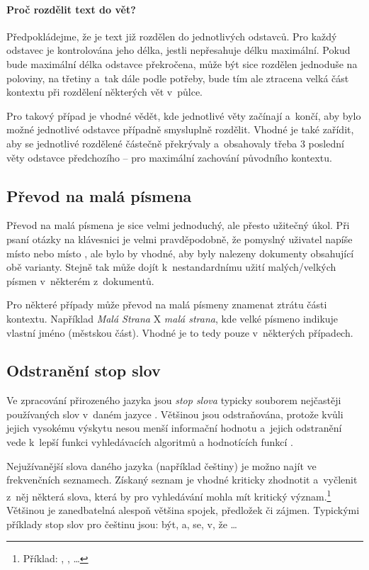 \paragraph{Proč rozdělit text do vět?}
Předpokládejme, že je text již rozdělen do jednotlivých odstavců. Pro každý odstavec je kontrolována jeho délka, jestli nepřesahuje délku maximální. Pokud bude maximální délka odstavce překročena, může být sice rozdělen jednoduše na poloviny, na třetiny a~tak dále podle potřeby, bude tím ale ztracena velká část kontextu při rozdělení některých vět v~půlce.\par
Pro takový případ je vhodné vědět, kde jednotlivé věty začínají a~končí, aby bylo možné jednotlivé odstavce případně smysluplně rozdělit. Vhodné je také zařídit, aby se jednotlivé rozdělené  částečně překrývaly a~obsahovaly třeba 3 poslední věty odstavce předchozího -- pro maximální zachování původního kontextu.

\subsection{Převod na malá písmena}
\label{prevod_na_mala}
Převod na malá písmena je sice velmi jednoduchý, ale přesto užitečný úkol. Při psaní otázky na klávesnici je velmi pravděpodobně, že pomyslný uživatel napíše  místo  nebo  místo , ale bylo by vhodné, aby byly nalezeny dokumenty obsahující obě varianty. Stejně tak může dojít k~nestandardnímu užití malých/velkých písmen v~některém z~dokumentů.\par
Pro některé případy může převod na malá písmeny znamenat ztrátu části kontextu. Například \emph{Malá Strana} X \emph{malá strana}, kde velké písmeno indikuje vlastní jméno (městskou část). Vhodné je to tedy pouze v~některých případech.

\subsection{Odstranění stop slov}
\label{stopwords}
Ve zpracování přirozeného jazyka jsou \emph{stop slova} typicky souborem nejčastěji používaných slov v~daném jazyce \cite{information_retrieval}. Většinou jsou odstraňována, protože kvůli jejich vysokému výskytu nesou menší informační hodnotu a~jejich odstranění vede k~lepší funkci vyhledávacích algoritmů a hodnotících funkcí \cite{bm25_improvements}.\par
Nejužívanější slova daného jazyka (například češtiny) je možno najít ve frekvenčních seznamech. Získaný seznam je vhodné kriticky zhodnotit a~vyčlenit z~něj některá slova, která by pro vyhledávání mohla mít kritický význam.\footnote{Příklad: , ,  \dots} Většinou je zanedbatelná alespoň většina spojek, předložek či zájmen. Typickými příklady stop slov pro češtinu jsou: být, a, se, v, že \dots

